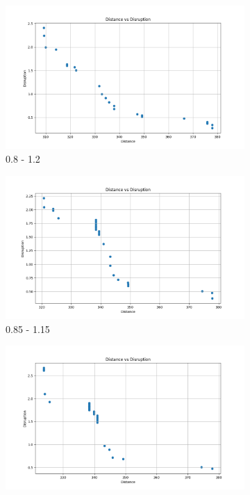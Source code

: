 \documentclass[12pt,a4paper]{article}
\begin{document}
\begin{figure}[H]
    \centering
    \begin{subfigure}{0.32\textwidth}
        \centering
        \includegraphics[width=\textwidth]{figures/solve2-0.8.png}
        \caption{0.8 - 1.2}
        \label{fig:solve1}
    \end{subfigure}
    \hfill
    \begin{subfigure}{0.32\textwidth}
        \centering
        \includegraphics[width=\textwidth]{figures/solve2-0.85.png}
        \caption{0.85 - 1.15}
        \label{fig:solve2}
    \end{subfigure}
    \hfill
    \begin{subfigure}{0.32\textwidth}
        \centering
        \includegraphics[width=\textwidth]{figures/solve2-0.9.png}

\end{subfigure}
\end{figure}
\end{document}
